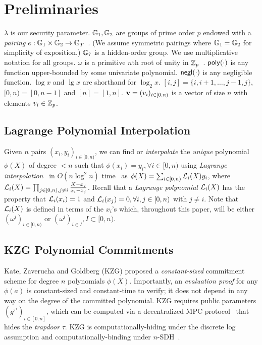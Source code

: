 \section{Preliminaries}
\label{s:prelim}

$\lambda$ is our security parameter.
$\mathbb{G}_1,\mathbb{G}_2$ are groups of prime order $p$ endowed with a \textit{pairing} $e : \mathbb{G}_1 \times \mathbb{G}_2 \rightarrow \mathbb{G}_T$\ifNotCameraReady~\cite{MVO91,Joux00}\fi.
(We assume symmetric pairings where $\mathbb{G}_1=\mathbb{G}_2$ for simplicity of exposition.)
$\mathbb{G}_{?}$ is a hidden-order group.
We use multiplicative notation for all groups.
$\omega$ is a primitive $n$th root of unity in $\mathbb{Z}_p$~\cite{vG13ModernCh8}.
$\mathsf{poly}(\cdot)$ is any function upper-bounded by some univariate polynomial.
$\mathsf{negl}(\cdot)$ is any negligible function.
$\log{x}$ and $\lg{x}$ are shorthand for $\log_2{x}$.
$[i,j] = \{i,i+1,\dots,j-1,j\}$, $[0,n) =[0,n-1]$ and $[n]=[1,n]$.
$\bm{\mathrm{v}}=(v_i)_{i\in[0,n)}$ is a vector of size $n$ with elements $v_i\in \mathbb{Z}_p$.

\ifCameraReady
{}
\else
\subsection{Lagrange Polynomial Interpolation}
\label{s:prelim:interpolation}
\fi
Given $n$ pairs $(x_i, y_i)_{i\in[0,n)}$, we can find or \textit{interpolate} the \textit{unique} polynomial $\phi(X)$ of degree $<n$ such that $\phi(x_i) = y_i, \forall i\in[0,n)$ using \textit{Lagrange interpolation}\ifNotCameraReady~\cite{BT04}\fi\xspace in $O(n\log^2{n})$ time~\cite{vG13ModernCh10} as
$\phi(X) = \sum_{i\in[0,n)} \mathcal{L}_i(X) y_i$, where $\mathcal{L}_i(X) = \prod_{\substack{j\in [0,n),j\ne i}}\frac{X-x_j}{x_i-x_j}$.
Recall that a \textit{Lagrange polynomial} $\mathcal{L}_i(X)$ has the property that $\mathcal{L}_i(x_i) = 1$ and $\mathcal{L}_i(x_j)=0, \forall i,j\in[0,n)$ with $j \ne i$.
Note that $\mathcal{L}_i(X)$ is defined in terms of the $x_i$'s which, throughout this paper, will be either $(\omega^i)_{i\in[0,n)}$ or $(\omega^i)_{i\in I}, I\subset [0,n)$.

\subsection{KZG Polynomial Commitments}
\label{s:prelim:polycommit:kzg}

Kate, Zaverucha and Goldberg (KZG) proposed a \textit{constant-sized} commitment scheme for degree $n$ polynomials $\phi(X)$.
Importantly, an \textit{evaluation proof} for any $\phi(a)$ is constant-sized and constant-time to verify; it does not depend in any way on the degree of the committed polynomial.
KZG requires public parameters $(g^{\tau^i})_{i\in[0,n]}$, which can be computed via a decentralized MPC protocol~\cite{BGM17} that hides the \textit{trapdoor} $\tau$.
KZG is computationally-hiding under the discrete log assumption and computationally-binding under $n$-SDH~\cite{BB08j}.

